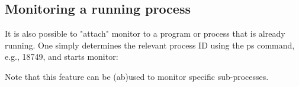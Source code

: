 \subsection{Monitoring a running process}

It is also possible to "attach" monitor to a program or process that is already running. One simply determines the relevant process ID using the ps command, e.g., 18749, and starts monitor:
\begin{prompt}
$ %
\end{prompt}

Note that this feature can be (ab)used to monitor specific sub-processes.

